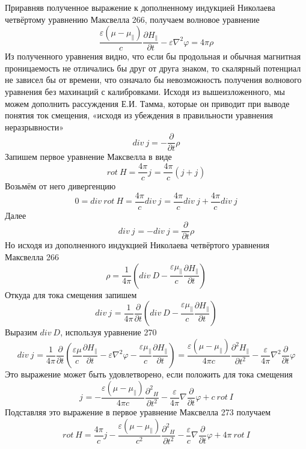 \documentclass[11pt]{article}
\begin{document}
Приравняв полученное выражение к дополненному индукцией Николаева
четвёртому уравнению Максвелла 266, получаем волновое уравнение
\[\frac{\varepsilon \left( \mu -{{\mu }_{\parallel }} \right)}{c}\frac{\partial {{H}_{\parallel }}}{\partial t}-\varepsilon {{\nabla }^{2}}\varphi =4\pi \rho \]
Из полученного уравнения видно, что если бы продольная и обычная
магнитная проницаемость не отличались бы друг от друга знаком, то
скалярный потенциал не зависел бы от времени, что означало бы
невозможность получения волнового уравнения без махинаций с
калибровками. Исходя из вышеизложенного, мы можем дополнить рассуждения
Е.И. Тамма, которые он приводит при выводе понятия ток смещения, «исходя
из убеждения в правильности уравнения неразрывности»
\[div\ j=-\frac{\partial }{\partial t}\rho \] Запишем первое уравнение
Максвелла в виде
\[rot\ H=\frac{4\pi }{c}{{j}_{}}=\frac{4\pi }{c}\left( j+{{j}_{}} \right)\]
Возьмём от него дивергенцию
\[0=div\ rot\ H=\frac{4\pi }{c}div\ {{j}_{}}=\frac{4\pi }{c}div\ j+\frac{4\pi }{c}div\ {{j}_{}}\]
Далее \[div\ {{j}_{}}=-div\ j=\frac{\partial }{\partial t}\rho \] Но
исходя из дополненного индукцией Николаева четвёртого уравнения
Максвелла 266
\[\rho =\frac{1}{4\pi }\left( div\ D-\frac{\varepsilon {{\mu }_{\parallel }}}{c}\frac{\partial {{H}_{\parallel }}}{\partial t} \right)\]
Откуда для тока смещения запишем
\[div\ {{j}_{}}=\frac{1}{4\pi }\frac{\partial }{\partial t}\left( div\ D-\frac{\varepsilon {{\mu }_{\parallel }}}{c}\frac{\partial {{H}_{\parallel }}}{\partial t} \right)\]
Выразим \(div\ D\), используя уравнение 270
\[div\ {{j}_{}}=\frac{1}{4\pi }\frac{\partial }{\partial t}\left( \frac{\varepsilon \mu }{c}\frac{\partial {{H}_{\parallel }}}{\partial t}-\varepsilon {{\nabla }^{2}}\varphi -\frac{\varepsilon {{\mu }_{\parallel }}}{c}\frac{\partial {{H}_{\parallel }}}{\partial t} \right)=\frac{\varepsilon \left( \mu -{{\mu }_{\parallel }} \right)}{4\pi c}\frac{{{\partial }^{2}}{{H}_{\parallel }}}{\partial {{t}^{2}}}-\frac{\varepsilon }{4\pi }{{\nabla }^{2}}\frac{\partial }{\partial t}\varphi \]
Это выражение может быть удовлетворено, если положить для тока смещения
\[{{j}_{}}=-\frac{\varepsilon \left( \mu -{{\mu }_{\parallel }} \right)}{4\pi c}\frac{{{\partial }^{2}}{{}_{H}}}{\partial {{t}^{2}}}-\frac{\varepsilon }{4\pi }\nabla \frac{\partial }{\partial t}\varphi +c\ rot\ I\]
Подставляя это выражение в первое уравнение Максвелла 273 получаем
\[rot\ H=\frac{4\pi }{c}j-\frac{\varepsilon \left( \mu -{{\mu }_{\parallel }} \right)}{{{c}^{2}}}\frac{{{\partial }^{2}}{{}_{H}}}{\partial {{t}^{2}}}-\frac{\varepsilon }{c}\nabla \frac{\partial }{\partial t}\varphi +4\pi \ rot\ I\]
\end{document}
